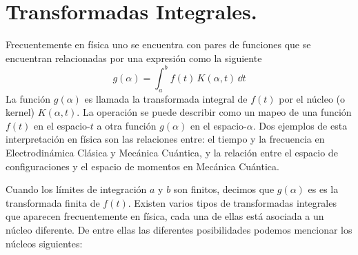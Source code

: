 \section{Transformadas Integrales.}
Frecuentemente en física uno se encuentra con pares de funciones que se encuentran relacionadas por una expresión como la siguiente
\begin{equation}
g (\alpha) = \int_{a}^{b} f(t) \, K(\alpha, t) \, \dd t
\label{eq:ecuacion_15_01}
\end{equation}
La función $g (\alpha)$ es llamada la transformada integral de $f(t)$ por el núcleo (o kernel)  $K (\alpha,t)$. La operación se puede describir como un mapeo de una función $f(t)$ en el espacio-$t$ a otra función $g (\alpha)$ en el espacio-$\alpha$. Dos ejemplos de esta interpretación en física son las relaciones entre: el tiempo y la frecuencia en Electrodinámica Clásica y Mecánica Cuántica, y la relación entre el espacio de configuraciones y el espacio de momentos en Mecánica Cuántica.
\par
Cuando los límites de integración $a$ y $b$ son finitos, decimos que $g(\alpha)$ es es la transformada finita de $f(t)$. Existen varios tipos de transformadas integrales que aparecen frecuentemente en física, cada una de ellas está asociada a un núcleo diferente. De entre ellas las diferentes posibilidades podemos mencionar los núcleos siguientes:
